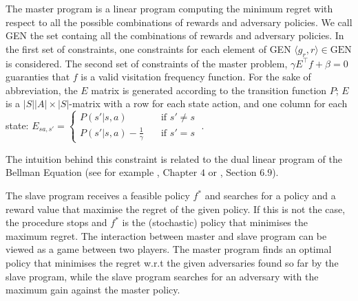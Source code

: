 \documentclass[runningheads,a4paper]{llncs}
\begin{document}
The master program is a linear program computing the minimum regret with respect to all the possible combinations of rewards and adversary policies. We call GEN the set containg all the combinations of rewards and adversary policies. 
In the first set of constraints, one constraints for each element of GEN $\langle g_r, r \rangle \in \text{GEN}$ is considered. 
The second set of constraints of the master problem, $\gamma E ^{\top}f+ \beta = 0$ guaranties that $f$ is a valid visitation frequency function. For the sake of abbreviation, the $E$ matrix is generated according to the transition function $P$; $E$ is a $|S||A| \times |S|$-matrix with a row for each state action, and one column for each state: $E_{sa,s'} = 
     \begin{cases}
       P(s'|s, a) &\quad \text{if } s' \neq s\\
       P(s'|s, a) - \frac{1}{\gamma} &\quad \text{if } s' = s
     \end{cases}\;.$
     
The intuition behind this constraint is related to the dual linear program of the Bellman Equation (see for example \cite{Sutton1998}, Chapter $4$ or \citep{Puterman1994}, Section $6.9$). 


The slave program receives a feasible policy $f^*$ and 
searches for a policy and a reward value that maximise the regret of the given policy.
If this is not the case, the procedure stops and $f^*$ is the (stochastic) policy that minimises the maximum regret. 
The interaction between master and slave program  can be viewed as a game between two players. The master program  finds an optimal policy that minimises the regret  w.r.t the given adversaries found so far by the slave program, while the slave program searches for an adversary with the maximum gain against the master policy. 
\end{document}
